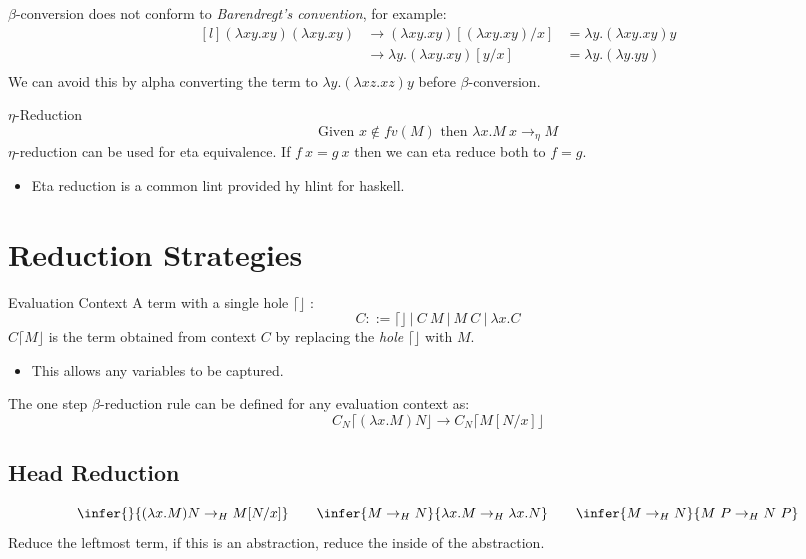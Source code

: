 $\beta$-conversion does not conform to \textit{Barendregt's convention}, for example:
\[\begin{matrix*}[l]
    (\lambda xy.x y) (\lambda xy.x y) & \to (\lambda xy.x y)[(\lambda xy.x y)/x] & = \lambda y . (\lambda xy.x y) y \\
    & \to \lambda y.(\lambda xy.x y)[y/x] & = \lambda y.(\lambda y. y y) \\
\end{matrix*}\]
We can avoid this by alpha converting the term to $\lambda y . (\lambda x z. x z) y$ before $\beta$-conversion.

\begin{definitionbox}{$\eta$-Reduction}
    \[\text{Given } x \not\in fv(M) \text{ then } \lambda x. M \ x \to_\eta M\]
    $\eta$-reduction can be used for eta equivalence. If $f \ x = g \ x$ then we can eta reduce both to $f = g$.
    \begin{itemize}
        \item Eta reduction is a common lint provided hy hlint for haskell.
    \end{itemize}
\end{definitionbox}

\section{Reduction Strategies}
\begin{definitionbox}{Evaluation Context}
    A term with a single hole $\lceil \rfloor$ :
    \[C ::= \lceil \rfloor \ | \ C \ M \ | \ M \ C \ | \ \lambda x. C\]
    $C\lceil M \rfloor$ is the term obtained from context $C$ by replacing the \textit{hole} $\lceil \rfloor$ with $M$.
    \begin{itemize}
        \item This allows any variables to be captured.
    \end{itemize}
    The one step $\beta$-reduction rule can be defined for any evaluation context as:
    \[C_N\lceil (\lambda x.M) N \rfloor \to C_N \lceil M[N/x] \rfloor\]
\end{definitionbox}

\subsection{Head Reduction}
\[\infer{}{(\lambda x. M) N \to_H M[N/x]} \qquad \infer{M \to_H N}{\lambda x. M \to_H \lambda x. N} \qquad \infer{M \to_H N}{M \ P \to_H N \ P}\]
Reduce the leftmost term, if this is an abstraction, reduce the inside of the abstraction.


